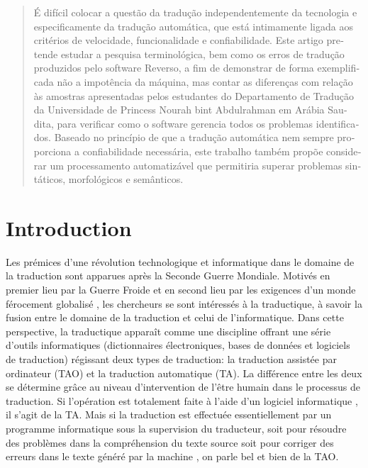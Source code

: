 \documentclass{textolivre}
\begin{document}
\begin{polyabstract}
\begin{english}
\begin{abstract}
\end{abstract}
\end{english}

\begin{portuguese}
\begin{abstract}
É difícil colocar a questão da tradução independentemente da tecnologia e especificamente da tradução automática, que está intimamente ligada aos critérios de velocidade, funcionalidade e confiabilidade. Este artigo pretende estudar a pesquisa terminológica, bem como os erros de tradução produzidos pelo software Reverso, a fim de demonstrar de forma exemplificada não a impotência da máquina, mas contar as diferenças com relação às amostras apresentadas pelos estudantes do Departamento de Tradução da Universidade de Princess Nourah bint Abdulrahman em Arábia Saudita, para verificar como o software gerencia todos os problemas identificados. Baseado no princípio de que a tradução automática nem sempre proporciona a confiabilidade necessária, este trabalho também propõe considerar um processamento automatizável que permitiria superar problemas sintáticos, morfológicos e semânticos.

\end{abstract}
\end{portuguese}

\end{polyabstract}


\section{Introduction}\label{sec-intro}
Les prémices d’une révolution technologique et informatique dans le domaine de la traduction sont apparues après la Seconde Guerre Mondiale.  Motivés en premier lieu par la Guerre Froide \cite{guidere2010} et en second lieu par les exigences d’un monde férocement globalisé \cite{paulsen2016}, les chercheurs se sont intéressés à la traductique, à savoir la fusion entre le domaine de la traduction et celui de l’informatique. Dans cette perspective, la traductique apparaît comme une discipline offrant une série d’outils informatiques (dictionnaires électroniques, bases de données et logiciels de traduction) régissant deux types de traduction: la traduction assistée par ordinateur (TAO) et la traduction automatique (TA). La différence entre les deux se détermine grâce au niveau d’intervention de l’être humain dans le processus de traduction. Si l’opération est totalement faite à l’aide d’un logiciel informatique \cite[p. 214]{segun2014}, il s’agit de la TA. Mais si la traduction est effectuée essentiellement par un programme informatique sous la supervision du traducteur, soit pour résoudre des problèmes dans la compréhension du texte source soit pour corriger des erreurs dans le texte généré par la machine \cite[p. 6]{alcina2008}, on parle bel et bien de la TAO.
\end{document}
